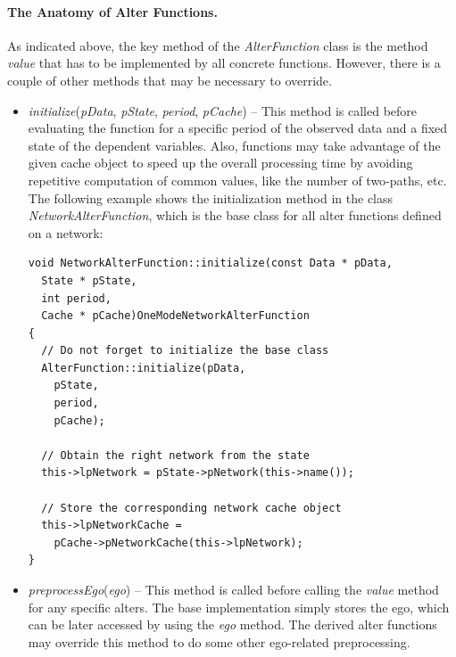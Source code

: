 \documentclass[12pt]{article}
\renewcommand{\=}{\,=\,}
\newcommand{\+}{\,+\,}
\newcommand{\nnm}[1]{\textsf{\small\textit{#1}}}
\begin{document}
\paragraph{The Anatomy of Alter Functions.} As indicated above, the key method of the \nnm{AlterFunction}
class is the method \nnm{value} that has to be implemented by all concrete functions. However, there is a
couple of other methods that may be necessary to override.
\begin{itemize}
\item \nnm{initialize}(\nnm{pData}, \nnm{pState}, \nnm{period}, \nnm{pCache}) -- This method is called
before evaluating the function for a specific period of the observed data and a fixed state of the dependent
variables. Also, functions may take advantage of the given cache object to speed up the overall
processing time by avoiding repetitive computation of common values, like the number of two-paths, etc.
The following example shows the initialization method in the class \nnm{NetworkAlterFunction}, which
is the base class for all alter functions defined on a network:
\begin{verbatim}
void NetworkAlterFunction::initialize(const Data * pData,
  State * pState,
  int period,
  Cache * pCache)OneModeNetworkAlterFunction
{
  // Do not forget to initialize the base class
  AlterFunction::initialize(pData,
    pState,
    period,
    pCache);

  // Obtain the right network from the state
  this->lpNetwork = pState->pNetwork(this->name());

  // Store the corresponding network cache object
  this->lpNetworkCache =
    pCache->pNetworkCache(this->lpNetwork);
}
\end{verbatim}

\item \nnm{preprocessEgo}(\nnm{ego}) -- This method is called before calling the \nnm{value} method for any
specific alters. The base implementation simply stores the ego, which can be later accessed by using the
\nnm{ego} method. The derived alter functions may override this method to do some other ego-related
preprocessing.
\end{itemize}
\end{document}
